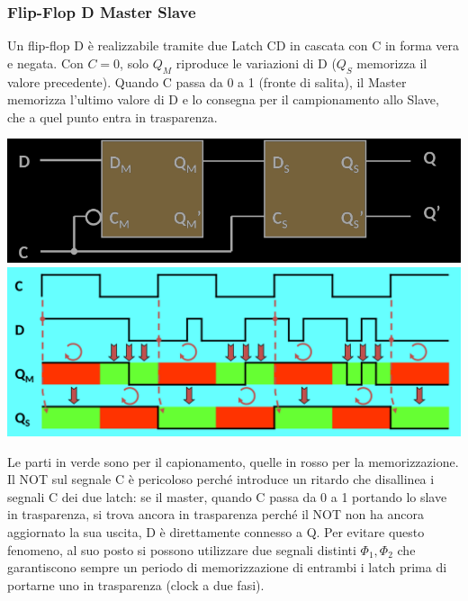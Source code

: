 \documentclass{article}
\begin{document}
\subsubsection{Flip-Flop D Master Slave}
Un flip-flop D è realizzabile tramite due Latch CD in cascata con C in forma vera e negata. Con $C=0$, solo $Q_M$ riproduce le variazioni di D ($Q_S$ memorizza il valore precedente). Quando C passa da 0 a 1 (fronte di salita), il Master memorizza l’ultimo valore di D e lo consegna per il campionamento allo Slave, che a quel punto entra in trasparenza.
\begin{center}
    \includegraphics[scale=0.35]{master-slave-schema.png}
    \includegraphics[scale=0.35]{master-slave-grafico.png}
\end{center}
Le parti in {\color{green}verde} sono per il capionamento, quelle in {\color{red} rosso} per la memorizzazione.
\vspace{0.2cm}\\
Il NOT sul segnale C è pericoloso perché introduce un ritardo che disallinea i segnali C dei due latch: se il master, quando C passa da 0 a 1 portando lo slave in trasparenza, si trova ancora in trasparenza perché il NOT non ha ancora aggiornato la sua uscita, D è direttamente connesso a Q. Per evitare questo fenomeno, al suo posto si possono utilizzare due segnali distinti $\Phi_1 , \Phi_2$ che garantiscono sempre un periodo di memorizzazione di entrambi i latch prima di portarne uno in trasparenza (clock a due fasi).
\end{document}
